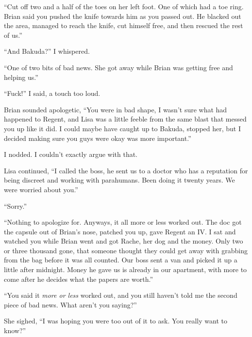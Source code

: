 ``Cut off two and a half of the toes on her left foot.  One of which had a toe ring.  Brian said you pushed the knife towards him as you passed out.  He blacked out the area, managed to reach the knife, cut himself free, and then rescued the rest of us.''



``And Bakuda?''  I whispered.



``One of two bits of bad news.  She got away while Brian was getting free and helping us.''



``Fuck!'' I said, a touch too loud.



Brian sounded apologetic, ``You were in bad shape, I wasn't sure what had happened to Regent, and Lisa was a little feeble from the same blast that messed you up like it did.  I could maybe have caught up to Bakuda, stopped her, but I decided making sure you guys were okay was more important.''



I nodded.  I couldn't exactly argue with that.



Lisa continued, ``I called the boss, he sent us to a doctor who has a reputation for being discreet and working with parahumans.  Been doing it twenty years.  We were worried about you.''



``Sorry.''



``Nothing to apologize for.  Anyways, it all more or less worked out.  The doc got the capsule out of Brian's nose, patched you up, gave Regent an IV.  I sat and watched you while Brian went and got Rache, her dog and the money.  Only two or three thousand gone, that someone thought they could get away with grabbing from the bag before it was all counted.  Our boss sent a van and picked it up a little after midnight.  Money he gave us is already in our apartment, with more to come after he decides what the papers are worth.''



``You said it \emph{more or less} worked out, and you still haven't told me the second piece of bad news.  What aren't you saying?''



She sighed, ``I was hoping you were too out of it to ask.  You really want to know?''



